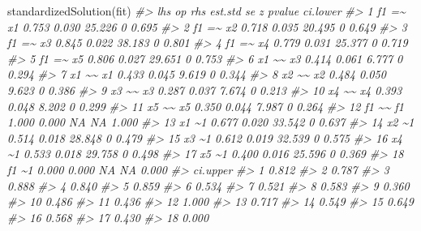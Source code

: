\documentclass[
  11pt,
]{krantz}
\makeatletter
\newenvironment{Shaded}{\begin{snugshade}}{\end{snugshade}}
\newcommand{\CommentTok}[1]{\textcolor[rgb]{0.37,0.37,0.37}{\textit{#1}}}
\newcommand{\FunctionTok}[1]{\textcolor[rgb]{0,0,0}{#1}}
\newcommand{\NormalTok}[1]{#1}
\newenvironment{kframe}{%
\medskip{}
\setlength{\fboxsep}{.8em}
 \def\at@end@of@kframe{}%
 \ifinner\ifhmode%
  \def\at@end@of@kframe{\end{minipage}}%
  \begin{minipage}{\columnwidth}%
 \fi\fi%
 \def\FrameCommand##1{\hskip\@totalleftmargin \hskip-\fboxsep
 \colorbox{shadecolor}{##1}\hskip-\fboxsep
     \hskip-\linewidth \hskip-\@totalleftmargin \hskip\columnwidth}%
 \MakeFramed {\advance\hsize-\width
   \@totalleftmargin\z@ \linewidth\hsize
   \@setminipage}}%
 {\par\unskip\endMakeFramed%
 \at@end@of@kframe}
\renewenvironment{Shaded}{\begin{kframe}}{\end{kframe}}
\theoremstyle{definition}
\theoremstyle{definition}
\theoremstyle{definition}
\theoremstyle{definition}
\theoremstyle{remark}
\makeatother
\begin{document}
\begin{Shaded}
\begin{Highlighting}[]
\FunctionTok{standardizedSolution}\NormalTok{(fit)}
\CommentTok{\#\textgreater{}    lhs op rhs est.std    se      z pvalue ci.lower}
\CommentTok{\#\textgreater{} 1   f1 =\textasciitilde{}  x1   0.753 0.030 25.226      0    0.695}
\CommentTok{\#\textgreater{} 2   f1 =\textasciitilde{}  x2   0.718 0.035 20.495      0    0.649}
\CommentTok{\#\textgreater{} 3   f1 =\textasciitilde{}  x3   0.845 0.022 38.183      0    0.801}
\CommentTok{\#\textgreater{} 4   f1 =\textasciitilde{}  x4   0.779 0.031 25.377      0    0.719}
\CommentTok{\#\textgreater{} 5   f1 =\textasciitilde{}  x5   0.806 0.027 29.651      0    0.753}
\CommentTok{\#\textgreater{} 6   x1 \textasciitilde{}\textasciitilde{}  x3   0.414 0.061  6.777      0    0.294}
\CommentTok{\#\textgreater{} 7   x1 \textasciitilde{}\textasciitilde{}  x1   0.433 0.045  9.619      0    0.344}
\CommentTok{\#\textgreater{} 8   x2 \textasciitilde{}\textasciitilde{}  x2   0.484 0.050  9.623      0    0.386}
\CommentTok{\#\textgreater{} 9   x3 \textasciitilde{}\textasciitilde{}  x3   0.287 0.037  7.674      0    0.213}
\CommentTok{\#\textgreater{} 10  x4 \textasciitilde{}\textasciitilde{}  x4   0.393 0.048  8.202      0    0.299}
\CommentTok{\#\textgreater{} 11  x5 \textasciitilde{}\textasciitilde{}  x5   0.350 0.044  7.987      0    0.264}
\CommentTok{\#\textgreater{} 12  f1 \textasciitilde{}\textasciitilde{}  f1   1.000 0.000     NA     NA    1.000}
\CommentTok{\#\textgreater{} 13  x1 \textasciitilde{}1       0.677 0.020 33.542      0    0.637}
\CommentTok{\#\textgreater{} 14  x2 \textasciitilde{}1       0.514 0.018 28.848      0    0.479}
\CommentTok{\#\textgreater{} 15  x3 \textasciitilde{}1       0.612 0.019 32.539      0    0.575}
\CommentTok{\#\textgreater{} 16  x4 \textasciitilde{}1       0.533 0.018 29.758      0    0.498}
\CommentTok{\#\textgreater{} 17  x5 \textasciitilde{}1       0.400 0.016 25.596      0    0.369}
\CommentTok{\#\textgreater{} 18  f1 \textasciitilde{}1       0.000 0.000     NA     NA    0.000}
\CommentTok{\#\textgreater{}    ci.upper}
\CommentTok{\#\textgreater{} 1     0.812}
\CommentTok{\#\textgreater{} 2     0.787}
\CommentTok{\#\textgreater{} 3     0.888}
\CommentTok{\#\textgreater{} 4     0.840}
\CommentTok{\#\textgreater{} 5     0.859}
\CommentTok{\#\textgreater{} 6     0.534}
\CommentTok{\#\textgreater{} 7     0.521}
\CommentTok{\#\textgreater{} 8     0.583}
\CommentTok{\#\textgreater{} 9     0.360}
\CommentTok{\#\textgreater{} 10    0.486}
\CommentTok{\#\textgreater{} 11    0.436}
\CommentTok{\#\textgreater{} 12    1.000}
\CommentTok{\#\textgreater{} 13    0.717}
\CommentTok{\#\textgreater{} 14    0.549}
\CommentTok{\#\textgreater{} 15    0.649}
\CommentTok{\#\textgreater{} 16    0.568}
\CommentTok{\#\textgreater{} 17    0.430}
\CommentTok{\#\textgreater{} 18    0.000}
\end{Highlighting}
\end{Shaded}
\end{document}

